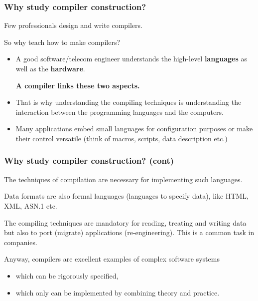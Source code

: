 
%
\begin{frame}
\frametitle{Why study compiler construction?}

Few professionals design and write compilers.

\bigskip

So why teach how to make compilers?
\begin{itemize}

  \item A good software/telecom engineer understands the high-level
  \textbf{languages} as well as the \textbf{hardware}.

  \textbf{A compiler links these two aspects.}

  \item That is why understanding the compiling techniques is
  understanding the interaction between the programming languages and
  the computers.

  \item Many applications embed small languages for configuration
  purposes or make their control versatile (think of macros, scripts,
  data description etc.)

\end{itemize}

\end{frame}

%
\begin{frame}
\frametitle{Why study compiler construction? (cont)}

The techniques of compilation are necessary for implementing such
languages.

\bigskip

Data formats are also formal languages (languages to specify data),
like HTML, XML, ASN.1 etc.

\bigskip

The compiling techniques are mandatory for reading, treating and
writing data but also to port (migrate) applications
(re-engineering). This is a common task in companies.

\bigskip

Anyway, compilers are excellent examples of complex software systems
\begin{itemize}

  \item which can be rigorously specified,

  \item which only can be implemented by combining theory and
  practice.

\end{itemize}

\end{frame}

